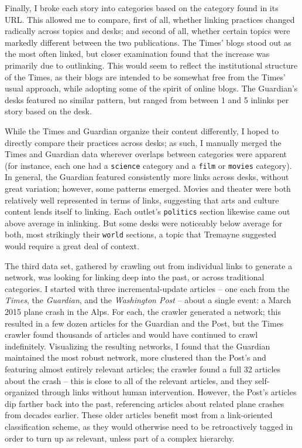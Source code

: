 Finally, I broke each story into categories based on the category found in its URL. This allowed me to compare, first of all, whether linking practices changed radically across topics and desks; and second of all, whether certain topics were markedly different between the two publications. The Times' blogs stood out as the most often linked, but closer examination found that the increase was primarily due to outlinking. This would seem to reflect the institutional structure of the Times, as their blogs are intended to be somewhat free from the Times' usual approach, while adopting some of the spirit of online blogs. The Guardian's desks featured no similar pattern, but ranged from between 1 and 5 inlinks per story based on the desk.

While the Times and Guardian organize their content differently, I hoped to directly compare their practices across desks; as such, I manually merged the Times and Guardian data wherever overlaps between categories were apparent (for instance, each one had a \texttt{science} category and a \texttt{film} or \texttt{movies} category). In general, the Guardian featured consistently more links across desks, without great variation; however, some patterns emerged. Movies and theater were both relatively well represented in terms of links, suggesting that arts and culture content lends itself to linking. Each outlet's \texttt{politics} section likewise came out above average in inlinking. But some desks were noticeably below average for both, most strikingly their \texttt{world} sections, a topic that Tremayne suggested would require a great deal of context.

The third data set, gathered by crawling out from individual links to generate a network, was looking for linking deep into the past, or across traditional categories. I started with three incremental-update articles -- one each from the \emph{Times}, the \emph{Guardian}, and the \emph{Washington Post} -- about a single event: a March 2015 plane crash in the Alps. For each, the crawler generated a network; this resulted in a few dozen articles for the Guardian and the Post, but the Times crawler found thousands of articles and would have continued to crawl indefinitely. Visualizing the resulting networks, I found that the Guardian maintained the most robust network, more clustered than the Post's and featuring almost entirely relevant articles; the crawler found a full 32 articles about the crash -- this is close to all of the relevant articles, and they self-organized through links without human intervention. However, the Post's articles dip farther back into the past, referencing articles about related plane crashes from decades earlier. These older articles benefit most from a link-oriented classification scheme, as they would otherwise need to be retroactively tagged in order to turn up as relevant, unless part of a complex hierarchy.

